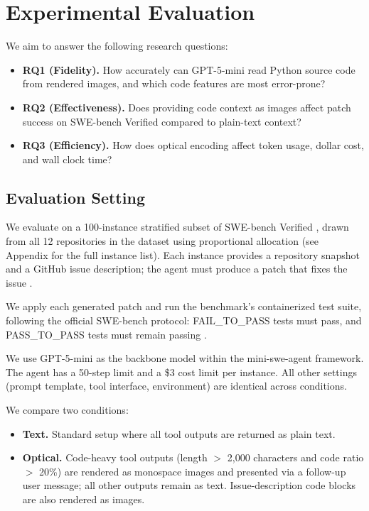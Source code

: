 \section{Experimental Evaluation}

We aim to answer the following research questions:
\begin{itemize}[leftmargin=*]
  \item \textbf{RQ1 (Fidelity).} How accurately can GPT-5-mini read Python source code from rendered images, and which code features are most error-prone?
  \item \textbf{RQ2 (Effectiveness).} Does providing code context as images affect patch success on SWE-bench Verified compared to plain-text context?
  \item \textbf{RQ3 (Efficiency).} How does optical encoding affect token usage, dollar cost, and wall clock time?
\end{itemize}

\subsection{Evaluation Setting}

We evaluate on a 100-instance stratified subset of SWE-bench Verified \cite{openai2024swebenchverified}, drawn from all 12 repositories in the dataset using proportional allocation (see Appendix for the full instance list). Each instance provides a repository snapshot and a GitHub issue description; the agent must produce a patch that fixes the issue \cite{jimenez2023swebench}.

We apply each generated patch and run the benchmark's containerized test suite, following the official SWE-bench protocol: FAIL\_TO\_PASS tests must pass, and PASS\_TO\_PASS tests must remain passing \cite{jimenez2023swebench}.

We use GPT-5-mini as the backbone model within the mini-swe-agent framework. The agent has a 50-step limit and a \$3 cost limit per instance. All other settings (prompt template, tool interface, environment) are identical across conditions.

We compare two conditions:
\begin{itemize}[leftmargin=*]
  \item \textbf{Text.} Standard setup where all tool outputs are returned as plain text.
  \item \textbf{Optical.} Code-heavy tool outputs (length $>$ 2{,}000 characters and code ratio $>$ 20\%) are rendered as monospace images and presented via a follow-up user message; all other outputs remain as text. Issue-description code blocks are also rendered as images.
\end{itemize}

